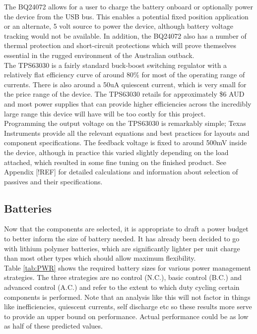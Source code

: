 \documentclass[12pt,openany,a4paper]{book}
\begin{document}
		The BQ24072 allows for a user to charge the battery onboard or optionally power the device from the USB bus. This enables a potential fixed position application or an alternate, 5 volt source to power the device, although battery voltage tracking would not be available. In addition, the BQ24072 also has a number of thermal protection and short-circuit protections which will prove themselves essential in the rugged environment of the Australian outback. \\
		
		The TPS63030 is a fairly standard buck-boost switching regulator with a relatively flat efficiency curve of around 80\% for most of the operating range of currents. There is also around a 50uA quiescent current, which is very small for the price range of the device. The TPS63030 retails for approximately \$6 AUD and most power supplies that can provide higher efficiencies across the incredibly large range this device will have will be too costly for this project. \\
		
		
		Programming the output voltage on the TPS63030 is remarkably simple; Texas Instruments provide all the relevant equations and best practices for layouts and component specifications. The feedback voltage is fixed to around 500mV inside the device, although in practice this varied slightly depending on the load attached, which resulted in some fine tuning on the finished product. See Appendix [!REF] for detailed calculations and information about selection of passives and their specifications.
		
		\subsection{Batteries}
		Now that the components are selected, it is appropriate to draft a power budget to better inform the size of battery needed. It has already been decided to go with lithium polymer batteries, which are significantly lighter per unit charge than most other types which should allow maximum flexibility. \\
		
		Table \ref{tab:PWR} shows the required battery sizes for various power management strategies. The three strategies are no control (N.C.), basic control (B.C.) and advanced control (A.C.) and refer to the extent to which duty cycling certain components is performed. Note that an analysis like this will not factor in things like inefficiencies, quiescent currents,  self discharge etc so these results more serve to provide an upper bound on performance. Actual performance could be as low as half of these predicted values.\\
		
\end{document}
